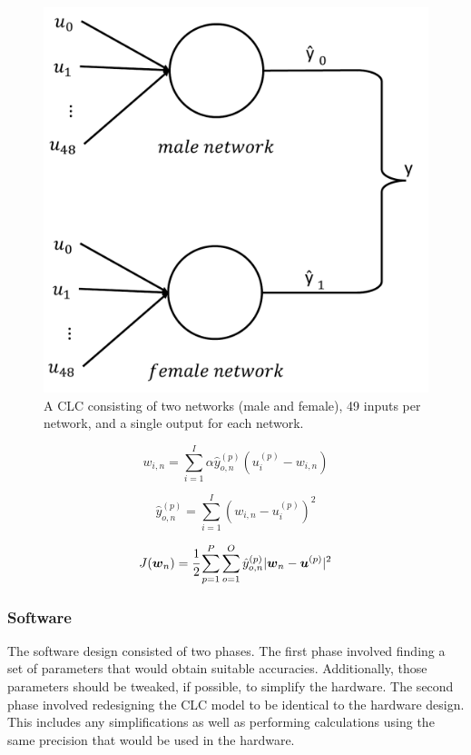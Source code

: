 \documentclass[10pt,journal]{IEEEtran}
\begin{document}
			\begin{figure}
				\centering
				\includegraphics[width=0.8\linewidth]{network}
				\caption{A CLC consisting of two networks (male and female), 49 inputs per network, and a single output for each network.}
				\label{fig:network}
			\end{figure}
			
			\begin{equation}
				\label{sw_weight_update}
				w_{i,n} = \displaystyle\sum_{i=1}^{I}\alpha\hat{y}_{o,n}^{(p)}(u_i^{(p)}-w_{i,n})
			\end{equation}
			
			\begin{equation}
				\label{sw_output}
				\hat{y}_{o,n}^{(p)} = \displaystyle\sum_{i=1}^{I}(w_{i,n} - u_i^{(p)})^2
			\end{equation}
			
			\begin{equation}
				\label{cost_function}
				J(\boldsymbol{w}_n) = \cfrac{1}{2}\displaystyle\sum_{p=1}^{P}\displaystyle\sum_{o=1}^{O}\hat{y}_{o,n}^{(p)}|\boldsymbol{w}_n-\boldsymbol{u}^{(p)}|^2
			\end{equation}
		
		\subsubsection{Software}
			The software design consisted of two phases. The first phase involved finding a set of parameters that would obtain suitable accuracies. Additionally, those parameters should be tweaked, if possible, to simplify the hardware. The second phase involved redesigning the CLC model to be identical to the hardware design. This includes any simplifications as well as performing calculations using the same precision that would be used in the hardware.
			
\end{document}
